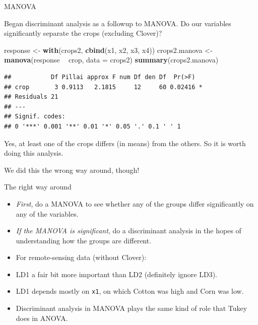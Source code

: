 \documentclass[ignorenonframetext,]{beamer}
\newenvironment{Shaded}{\begin{snugshade}}{\end{snugshade}}
\newcommand{\DataTypeTok}[1]{\textcolor[rgb]{0.13,0.29,0.53}{#1}}
\newcommand{\KeywordTok}[1]{\textcolor[rgb]{0.13,0.29,0.53}{\textbf{#1}}}
\newcommand{\NormalTok}[1]{#1}
\newcommand{\OperatorTok}[1]{\textcolor[rgb]{0.81,0.36,0.00}{\textbf{#1}}}
\newcommand{\StringTok}[1]{\textcolor[rgb]{0.31,0.60,0.02}{#1}}
\begin{document}
\begin{frame}[fragile]{MANOVA}
\protect\hypertarget{manova}{}

Began discriminant analysis as a followup to MANOVA. Do our variables
significantly separate the crops (excluding Clover)?

\begin{Shaded}
\begin{Highlighting}[]
\NormalTok{response <-}\StringTok{ }\KeywordTok{with}\NormalTok{(crops2, }\KeywordTok{cbind}\NormalTok{(x1, x2, x3, x4))}
\NormalTok{crops2.manova <-}\StringTok{ }\KeywordTok{manova}\NormalTok{(response }\OperatorTok{~}\StringTok{ }\NormalTok{crop, }\DataTypeTok{data =}\NormalTok{ crops2)}
\KeywordTok{summary}\NormalTok{(crops2.manova)}
\end{Highlighting}
\end{Shaded}

\begin{verbatim}
##           Df Pillai approx F num Df den Df  Pr(>F)  
## crop       3 0.9113   2.1815     12     60 0.02416 *
## Residuals 21                                        
## ---
## Signif. codes:  
## 0 '***' 0.001 '**' 0.01 '*' 0.05 '.' 0.1 ' ' 1
\end{verbatim}

Yes, at least one of the crops differs (in means) from the others. So it
is worth doing this analysis.

We did this the wrong way around, though!

\end{frame}

\begin{frame}[fragile]{The right way around}
\protect\hypertarget{the-right-way-around}{}

\begin{itemize}
\item
  \emph{First}, do a MANOVA to see whether any of the groups differ
  significantly on any of the variables.
\item
  \emph{If the MANOVA is significant}, do a discriminant analysis in the
  hopes of understanding how the groups are different.
\item
  For remote-sensing data (without Clover):
\item
  LD1 a fair bit more important than LD2 (definitely ignore LD3).
\item
  LD1 depends mostly on \texttt{x1}, on which Cotton was high and Corn
  was low.
\item
  Discriminant analysis in MANOVA plays the same kind of role that Tukey
  does in ANOVA.
\end{itemize}

\end{frame}
\end{document}
